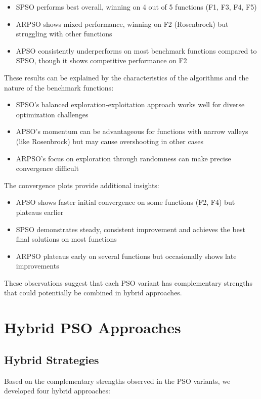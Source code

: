 \documentclass[conference]{IEEEtran}
\begin{document}
\begin{itemize}
    \item SPSO performs best overall, winning on 4 out of 5 functions (F1, F3, F4, F5)
    \item ARPSO shows mixed performance, winning on F2 (Rosenbrock) but struggling with other functions
    \item APSO consistently underperforms on most benchmark functions compared to SPSO, though it shows competitive performance on F2
\end{itemize}

These results can be explained by the characteristics of the algorithms and the nature of the benchmark functions:

\begin{itemize}
    \item SPSO's balanced exploration-exploitation approach works well for diverse optimization challenges
    \item APSO's momentum can be advantageous for functions with narrow valleys (like Rosenbrock) but may cause overshooting in other cases
    \item ARPSO's focus on exploration through randomness can make precise convergence difficult
\end{itemize}

The convergence plots provide additional insights:

\begin{itemize}
    \item APSO shows faster initial convergence on some functions (F2, F4) but plateaus earlier
    \item SPSO demonstrates steady, consistent improvement and achieves the best final solutions on most functions
    \item ARPSO plateaus early on several functions but occasionally shows late improvements
\end{itemize}

These observations suggest that each PSO variant has complementary strengths that could potentially be combined in hybrid approaches.

\section{Hybrid PSO Approaches}
\subsection{Hybrid Strategies}
Based on the complementary strengths observed in the PSO variants, we developed four hybrid approaches:
\end{document}
